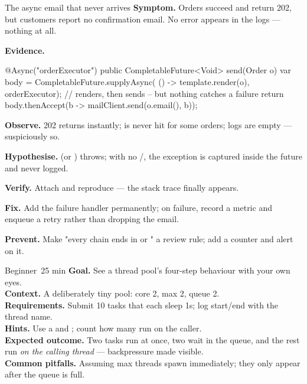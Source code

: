 \begin{debuglab}{The async email that never arrives}
\textbf{Symptom.} Orders succeed and return 202, but customers report no confirmation email. No error appears in the logs --- nothing at all.

\smallskip\textbf{Evidence.}
\begin{javabox}
@Async("orderExecutor")
public CompletableFuture<Void> send(Order o) {
  var body = CompletableFuture.supplyAsync(
      () -> template.render(o), orderExecutor);
  // renders, then sends -- but nothing catches a failure
  return body.thenAccept(b -> mailClient.send(o.email(), b));
}
\end{javabox}

\begin{tickcheck}
  \item \textbf{Observe.} 202 returns instantly;  is never hit for some orders; logs are empty --- suspiciously so.
  \item \textbf{Hypothesise.}  (or ) throws; with no /, the exception is captured inside the future and never logged.
  \item \textbf{Verify.} Attach  and reproduce --- the stack trace finally appears.
  \item \textbf{Fix.} Add the failure handler permanently; on failure, record a metric and enqueue a retry rather than dropping the email.
  \item \textbf{Prevent.} Make "every chain ends in  or " a review rule; add a  counter and alert on it.
\end{tickcheck}
\end{debuglab}


\begin{minilab}{Beginner}{~25 min}
\textbf{Goal.} See a thread pool's four-step behaviour with your own eyes.\\
\textbf{Context.} A deliberately tiny pool: core 2, max 2, queue 2.\\
\textbf{Requirements.} Submit 10 tasks that each sleep 1s; log start/end with the thread name.\\
\textbf{Hints.} Use a  and ; count how many run on the caller.\\
\textbf{Expected outcome.} Two tasks run at once, two wait in the queue, and the rest run \emph{on the calling thread} --- backpressure made visible.\\
\textbf{Common pitfalls.} Assuming max threads spawn immediately; they only appear after the queue is full.
\end{minilab}

